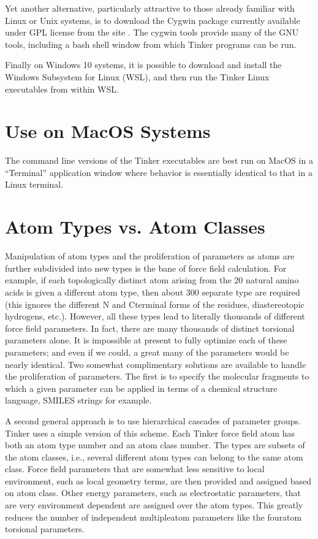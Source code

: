 \documentclass[letterpaper,11pt,english]{sphinxmanual}
\begin{document}
Yet another alternative, particularly attractive to those already familiar with Linux or Unix systems, is to download the Cygwin package currently available under GPL license from the site . The cygwin tools provide many of the GNU tools, including a bash shell window from which Tinker programs can be run.

Finally on Windows 10 systems, it is possible to download and install the Windows Subsystem for Linux (WSL), and then run the Tinker Linux executables from within WSL.


\section{Use on MacOS Systems}
\label{\detokenize{text/special-features:use-on-macos-systems}}
The command line versions of the Tinker executables are best run on MacOS in a “Terminal” application window where behavior is essentially identical to that in a Linux terminal.


\section{Atom Types vs. Atom Classes}
\label{\detokenize{text/special-features:atom-types-vs-atom-classes}}
Manipulation of atom types and the proliferation of parameters as atoms are further subdivided into new types is the bane of force field calculation. For example, if each topologically distinct atom arising from the 20 natural amino acids is given a different atom type, then about 300 separate type are required (this ignores the different N\sphinxhyphen{} and C\sphinxhyphen{}terminal forms of the residues, diastereotopic hydrogens, etc.). However, all these types lead to literally thousands of different force field parameters. In fact, there are many thousands of distinct torsional parameters alone. It is impossible at present to fully optimize each of these parameters; and even if we could, a great many of the parameters would be nearly identical. Two somewhat complimentary solutions are available to handle the proliferation of parameters. The first is to specify the molecular fragments to which a given parameter can be applied in terms of a chemical structure language, SMILES strings for example.

A second general approach is to use hierarchical cascades of parameter groups. Tinker uses a simple version of this scheme. Each Tinker force field atom has both an atom type number and an atom class number. The types are subsets of the atom classes, i.e., several different atom types can belong to the same atom class. Force field parameters that are somewhat less sensitive to local environment, such as local geometry terms, are then provided and assigned based on atom class. Other energy parameters, such as electrostatic parameters, that are very environment dependent are assigned over the atom types. This greatly reduces the number of independent multiple\sphinxhyphen{}atom parameters like the four\sphinxhyphen{}atom torsional parameters.
\end{document}
